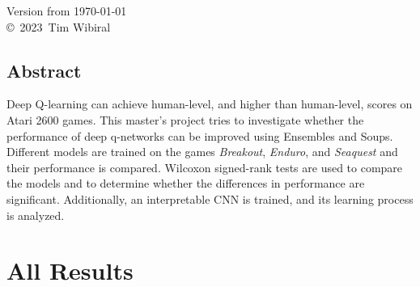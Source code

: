 \documentclass[a4paper,12pt,
headsepline,           %
oneside,               %
bibtotoc,              %
]{scrbook}
\newcommand{\fullname}{Tim Wibiral}
\newcommand{\jahr}{2023}
\begin{document}
\clearpage
\thispagestyle{empty}
{ \small
  \centering
  Version from \today \\\vfill
  \copyright~\jahr~\fullname\\[0.5em]
}
\clearpage



\thispagestyle{plain}
\section*{Abstract}

Deep Q-learning can achieve human-level, and higher than human-level, scores on Atari 2600 games. This master's project tries to investigate whether the performance of deep q-networks can be improved using Ensembles and Soups. Different models are trained on the games \emph{Breakout}, \emph{Enduro}, and \emph{Seaquest} and their performance is compared. 
Wilcoxon signed-rank tests are used to compare the models and to determine whether the differences in performance are significant. Additionally, an interpretable CNN is trained, and its learning process is analyzed. 
\clearpage

\mainmatter




\appendix
\chapter{All Results}\label{appendix:results}
\end{document}
